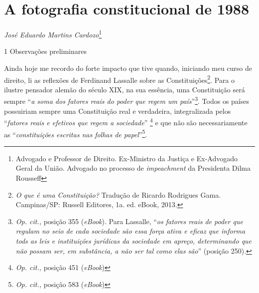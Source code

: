 \chapter{A fotografia constitucional de 1988}

\emph{José Eduardo Martins Cardozo}\footnote{Advogado e
Professor de Direito. Ex-Ministro da Justiça e Ex-Advogado
Geral da União. Advogado no processo de \emph{impeachment} da Presidenta
Dilma Rousseff}

  1 {Observações preliminares}

Ainda hoje me recordo do forte impacto que tive quando, iniciando meu
curso de direito, li as reflexões de Ferdinand Lassalle sobre as
Constituições\footnote{\emph{O que é uma Constituição?} Tradução de
  Ricardo Rodrigues Gama. Campinas/SP: Russell Editores, 1a. ed. eBook,
  2013.}. Para o ilustre pensador alemão do século XIX, na sua essência,
uma Constituição será sempre ``\emph{a soma dos fatores reais do poder
que regem um país}''\footnote{\emph{Op. cit.,} posição 355
  (\emph{eBook}). Para Lassalle, ``\emph{os fatores reais de poder que
  regulam no seio de cada sociedade são essa força ativa e eficaz que
  informa tods as leis e instituições jurídicas da sociedade em apreço,
  determinando que não possam ser, em substância, a não ser tal como
  elas são}'' (posição 250).}. Todos os países possuiriam sempre uma
Constituição real e verdadeira, integralizada pelos ``\emph{fatores
reais e efetivos que regem a sociedade}'' \footnote{\emph{Op. cit.,}
  posição 451 (\emph{eBook})} e que não são necessariamente as
``\emph{constituições escritas nas folhas de papel}''\footnote{\emph{Op.
  cit.,} posição 583 (\emph{eBook})}.

